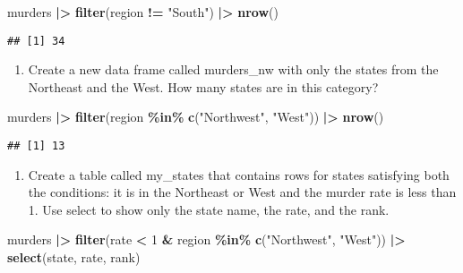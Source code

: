 \documentclass[
]{article}
\newenvironment{Shaded}{\begin{snugshade}}{\end{snugshade}}
\newcommand{\DecValTok}[1]{\textcolor[rgb]{0.00,0.00,0.81}{#1}}
\newcommand{\FunctionTok}[1]{\textcolor[rgb]{0.13,0.29,0.53}{\textbf{#1}}}
\newcommand{\NormalTok}[1]{#1}
\newcommand{\SpecialCharTok}[1]{\textcolor[rgb]{0.81,0.36,0.00}{\textbf{#1}}}
\newcommand{\StringTok}[1]{\textcolor[rgb]{0.31,0.60,0.02}{#1}}
\providecommand{\tightlist}{%
  \setlength{\itemsep}{0pt}\setlength{\parskip}{0pt}}
\begin{document}
\begin{Shaded}
\begin{Highlighting}[]
\NormalTok{murders }\SpecialCharTok{|\textgreater{}} \FunctionTok{filter}\NormalTok{(region }\SpecialCharTok{!=} \StringTok{"South"}\NormalTok{) }\SpecialCharTok{|\textgreater{}} \FunctionTok{nrow}\NormalTok{()}
\end{Highlighting}
\end{Shaded}

\begin{verbatim}
## [1] 34
\end{verbatim}

\begin{enumerate}
\def\labelenumi{\arabic{enumi}.}
\setcounter{enumi}{5}
\tightlist
\item
  Create a new data frame called murders\_nw with only the states from
  the Northeast and the West. How many states are in this category?
\end{enumerate}

\begin{Shaded}
\begin{Highlighting}[]
\NormalTok{murders }\SpecialCharTok{|\textgreater{}} \FunctionTok{filter}\NormalTok{(region }\SpecialCharTok{\%in\%} \FunctionTok{c}\NormalTok{(}\StringTok{"Northwest"}\NormalTok{, }\StringTok{"West"}\NormalTok{)) }\SpecialCharTok{|\textgreater{}} \FunctionTok{nrow}\NormalTok{()}
\end{Highlighting}
\end{Shaded}

\begin{verbatim}
## [1] 13
\end{verbatim}

\begin{enumerate}
\def\labelenumi{\arabic{enumi}.}
\setcounter{enumi}{6}
\tightlist
\item
  Create a table called my\_states that contains rows for states
  satisfying both the conditions: it is in the Northeast or West and the
  murder rate is less than 1. Use select to show only the state name,
  the rate, and the rank.
\end{enumerate}

\begin{Shaded}
\begin{Highlighting}[]
\NormalTok{murders }\SpecialCharTok{|\textgreater{}} \FunctionTok{filter}\NormalTok{(rate }\SpecialCharTok{\textless{}} \DecValTok{1} \SpecialCharTok{\&}\NormalTok{ region }\SpecialCharTok{\%in\%} \FunctionTok{c}\NormalTok{(}\StringTok{"Northwest"}\NormalTok{, }\StringTok{"West"}\NormalTok{)) }\SpecialCharTok{|\textgreater{}}
  \FunctionTok{select}\NormalTok{(state, rate, rank)}
\end{Highlighting}
\end{Shaded}
\end{document}
